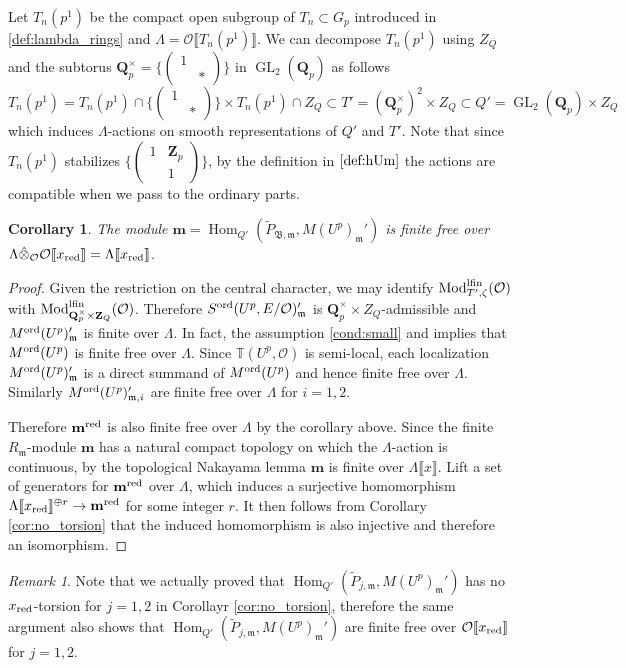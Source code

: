 \documentclass[leqno]{amsart}
\newtheorem{cor}[thm]{Corollary}
\theoremstyle{definition}
\theoremstyle{remark}
\newtheorem{rem}[thm]{Remark}
\newcommand{\smat}[1]{\left(\begin{smallmatrix} #1 \end{smallmatrix}\right)}
\newcommand{\oo}{\mathcal{O}}
\newcommand{\Z}{{\mathbf{Z}}}
\newcommand{\Qp}{\mathbf{Q}_p}
\newcommand{\Zp}{\mathbf{Z}_p}
\DeclareMathOperator{\Hom}{Hom}
\DeclareMathOperator{\GL}{GL}
\newcommand{\fm}{\mathfrak{m}}
\DeclareMathOperator{\Mod}{\textnormal{Mod}}
\newcommand{\B}{\mathfrak B} %
\newcommand{\lfin}{\textnormal{lfin}}
\newcommand{\red}{\textnormal{red}}
\newcommand{\xx}{x_\textnormal{red}}
\newcommand{\TT}{\mathbb{T}} %
\newcommand{\ord}{\textnormal{ord}} %
\begin{document}
Let $T_n(p^1)$ be the compact open subgroup of $T_n\subset G_p$
introduced in \eqref{def:lambda_rings}
and $\Lambda=\oo\llbracket T_n(p^1)\rrbracket$.
We can decompose $T_n(p^1)$
using $Z_Q$ and the subtorus 
$\Qp^\times=\{\smat{1&\\&*}\}$ in $\GL_2(\Qp)$ as follows
\[
    T_n(p^1)=T_n(p^1)\cap \{\smat{1&\\&*}\}\times 
    T_n(p^1)\cap Z_Q\subset T'=(\Qp^\times)^2\times Z_Q
    \subset Q'=\GL_2(\Qp)\times Z_Q
\]
which induces $\Lambda$-actions on smooth representations
of $Q'$ and $T'$.
Note that since $T_n(p^1)$ stabilizes 
$\{\smat{1&\Zp\\&1}\}$,
by the definition in $\eqref{def:hUm}$
the actions are compatible 
when we pass to the ordinary parts.

\begin{cor}\label{cor:Hecke_finite}
The module
$\mathbf{m}=\Hom_{Q'}(\tilde{P}_{\B,\fm},
M(U^p)_{\fm}')$
is finite free over 
$\Lambda\hat{\otimes}_{\oo}\oo\llbracket \xx\rrbracket 
=\Lambda\llbracket \xx\rrbracket$.
\end{cor}
\begin{proof}
    Given the restriction
    on the central character, we may identify 
    $\Mod_{T',\zeta}^{\lfin}(\oo)$
    with $\Mod_{\Qp^\times\times \Z_Q}^{\lfin}(\oo)$.
    Therefore $S^{\ord}(U^p,E/\oo)_\fm'$
    is $\Qp^\times\times Z_Q$-admissible
    and $M^{\ord}(U^p)_\fm'$ is finite over $\Lambda$.
    In fact, the assumption \eqref{cond:small}
    and \cite[Prop 2.20]{pask} 
    implies that $M^{\ord}(U^p)$
    is finite free over $\Lambda$.
    Since $\TT(U^p,\oo)$ is semi-local,
    each localization $M^{\ord}(U^p)_\fm'$
    is a direct summand of $M^{\ord}(U^p)$
    and hence finite free over $\Lambda$.
    Similarly  $M^{\ord}(U^p)_{\fm,i}'$   
    are finite free over $\Lambda$ for $i=1,2$.
    
    Therefore $\mathbf{m}^{\red}$ 
	is also finite free over $\Lambda$
    by the corollary above.
    Since the finite $R_\fm$-module
    $\mathbf{m}$ has a natural compact topology
    on which the $\Lambda$-action is continuous,
	by the topological Nakayama lemma
	$\mathbf{m}$ is finite over $\Lambda\llbracket x\rrbracket$.
    Lift a set of generators for $\mathbf{m}^{\red}$
    over $\Lambda$,
    which induces a surjective homomorphism
    $\Lambda\llbracket \xx\rrbracket^{\oplus r}\to 
    \mathbf{m}^{\red}$
    for some integer $r$.
    It then follows from Corollary 
    \ref{cor:no_torsion}
    that the induced homomorphism is also injective
    and therefore an isomorphism.
\end{proof}
\begin{rem}
Note that we actually proved that
$\Hom_{Q'}(\tilde{P}_{j,\fm},M(U^p)_\fm')$
has no $\xx$-torsion for $j=1,2$
in Corollayr \ref{cor:no_torsion},
therefore the same argument also shows that
$\Hom_{Q'}(\tilde{P}_{j,\fm},M(U^p)_\fm')$
are finite free over 
$\oo\llbracket\xx\rrbracket$ for $j=1,2$.
\end{rem}
\end{document}
